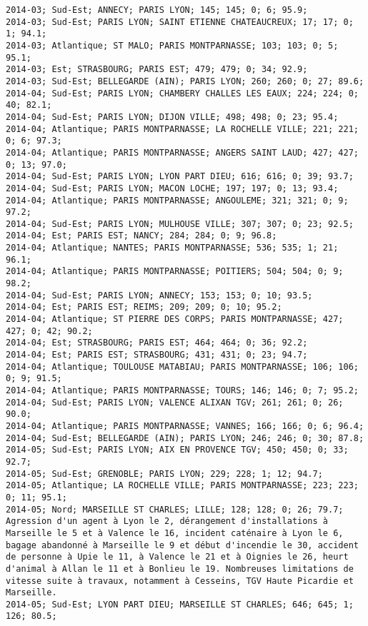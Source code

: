 \documentclass{article}
\begin{document}
\begin{Verbatim}[commandchars=\\\{\}]
2014-03; Sud-Est; ANNECY; PARIS LYON; 145; 145; 0; 6; 95.9; 
2014-03; Sud-Est; PARIS LYON; SAINT ETIENNE CHATEAUCREUX; 17; 17; 0; 1; 94.1; 
2014-03; Atlantique; ST MALO; PARIS MONTPARNASSE; 103; 103; 0; 5; 95.1; 
2014-03; Est; STRASBOURG; PARIS EST; 479; 479; 0; 34; 92.9; 
2014-03; Sud-Est; BELLEGARDE (AIN); PARIS LYON; 260; 260; 0; 27; 89.6; 
2014-04; Sud-Est; PARIS LYON; CHAMBERY CHALLES LES EAUX; 224; 224; 0; 40; 82.1; 
2014-04; Sud-Est; PARIS LYON; DIJON VILLE; 498; 498; 0; 23; 95.4; 
2014-04; Atlantique; PARIS MONTPARNASSE; LA ROCHELLE VILLE; 221; 221; 0; 6; 97.3; 
2014-04; Atlantique; PARIS MONTPARNASSE; ANGERS SAINT LAUD; 427; 427; 0; 13; 97.0; 
2014-04; Sud-Est; PARIS LYON; LYON PART DIEU; 616; 616; 0; 39; 93.7; 
2014-04; Sud-Est; PARIS LYON; MACON LOCHE; 197; 197; 0; 13; 93.4; 
2014-04; Atlantique; PARIS MONTPARNASSE; ANGOULEME; 321; 321; 0; 9; 97.2; 
2014-04; Sud-Est; PARIS LYON; MULHOUSE VILLE; 307; 307; 0; 23; 92.5; 
2014-04; Est; PARIS EST; NANCY; 284; 284; 0; 9; 96.8; 
2014-04; Atlantique; NANTES; PARIS MONTPARNASSE; 536; 535; 1; 21; 96.1; 
2014-04; Atlantique; PARIS MONTPARNASSE; POITIERS; 504; 504; 0; 9; 98.2; 
2014-04; Sud-Est; PARIS LYON; ANNECY; 153; 153; 0; 10; 93.5; 
2014-04; Est; PARIS EST; REIMS; 209; 209; 0; 10; 95.2; 
2014-04; Atlantique; ST PIERRE DES CORPS; PARIS MONTPARNASSE; 427; 427; 0; 42; 90.2; 
2014-04; Est; STRASBOURG; PARIS EST; 464; 464; 0; 36; 92.2; 
2014-04; Est; PARIS EST; STRASBOURG; 431; 431; 0; 23; 94.7; 
2014-04; Atlantique; TOULOUSE MATABIAU; PARIS MONTPARNASSE; 106; 106; 0; 9; 91.5; 
2014-04; Atlantique; PARIS MONTPARNASSE; TOURS; 146; 146; 0; 7; 95.2; 
2014-04; Sud-Est; PARIS LYON; VALENCE ALIXAN TGV; 261; 261; 0; 26; 90.0; 
2014-04; Atlantique; PARIS MONTPARNASSE; VANNES; 166; 166; 0; 6; 96.4; 
2014-04; Sud-Est; BELLEGARDE (AIN); PARIS LYON; 246; 246; 0; 30; 87.8; 
2014-05; Sud-Est; PARIS LYON; AIX EN PROVENCE TGV; 450; 450; 0; 33; 92.7; 
2014-05; Sud-Est; GRENOBLE; PARIS LYON; 229; 228; 1; 12; 94.7; 
2014-05; Atlantique; LA ROCHELLE VILLE; PARIS MONTPARNASSE; 223; 223; 0; 11; 95.1; 
2014-05; Nord; MARSEILLE ST CHARLES; LILLE; 128; 128; 0; 26; 79.7; Agression d'un agent à Lyon le 2, dérangement d'installations à Marseille le 5 et à Valence le 16, incident caténaire à Lyon le 6, bagage abandonné à Marseille le 9 et début d'incendie le 30, accident de personne à Upie le 11, à Valence le 21 et à Oignies le 26, heurt d'animal à Allan le 11 et à Bonlieu le 19. Nombreuses limitations de vitesse suite à travaux, notamment à Cesseins, TGV Haute Picardie et Marseille.
2014-05; Sud-Est; LYON PART DIEU; MARSEILLE ST CHARLES; 646; 645; 1; 126; 80.5; 

\end{Verbatim}
\end{document}
